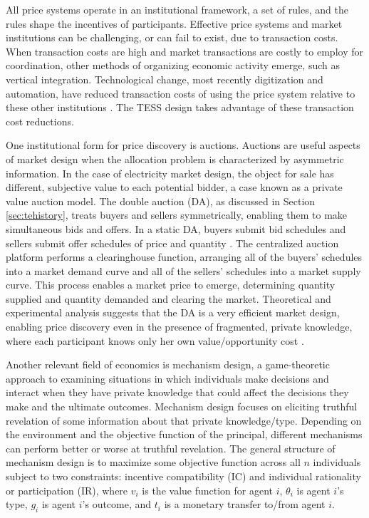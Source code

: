 All price systems operate in an institutional framework, a set of rules, and the rules shape the incentives of participants. Effective price systems and market institutions can be challenging, or can fail to exist, due to transaction costs. When transaction costs are high and market transactions are costly to employ for coordination, other methods of organizing economic activity emerge, such as vertical integration. Technological change, most recently digitization and automation, have reduced transaction costs of using the price system relative to these other institutions \citep{kiesling_2016}. The TESS design takes advantage of these transaction cost reductions.

One institutional form for price discovery is auctions. Auctions are useful aspects of market design when the allocation problem is characterized by asymmetric information. In the case of electricity market design, the object for sale has different, subjective value to each potential bidder, a case known as a private value auction model. The double auction (DA), as discussed in Section \ref{sec:tehistory}, treats buyers and sellers symmetrically, enabling them to make simultaneous bids and offers. In a static DA, buyers submit bid schedules and sellers submit offer schedules of price and quantity \citep{friedman1993double}. The centralized auction platform performs a clearinghouse function, arranging all of the buyers’ schedules into a market demand curve and all of the sellers’ schedules into a market supply curve. 
This process enables a market price to emerge, determining quantity supplied and quantity demanded and clearing the market. 
Theoretical and experimental analysis suggests that the DA is a very efficient market design, enabling price discovery even in the presence of fragmented, private knowledge, where each participant knows only her own value/opportunity cost \citep{easley1993theories}.

Another relevant field of economics is mechanism design, a game-theoretic approach to examining situations in which individuals make decisions and interact when they have private knowledge that could affect the decisions they make and the ultimate outcomes. Mechanism design focuses on eliciting truthful revelation of some information about that private knowledge/type. Depending on the environment and the objective function of the principal, different mechanisms can perform better or worse at truthful revelation.
The general structure of mechanism design is to maximize some objective function across all $n$ individuals subject to two constraints: incentive compatibility (IC) and individual rationality or participation (IR), where $v_i$ is the value function for agent $i$, $\theta_i$ is agent $i$'s type, $g_i$ is agent $i$'s outcome, and $t_i$ is a monetary transfer to/from agent $i$.

